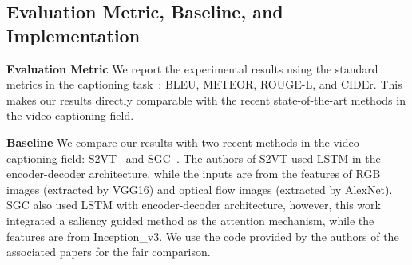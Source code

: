 \subsection{Evaluation Metric, Baseline, and Implementation}
\textbf{Evaluation Metric} We report the experimental results using the standard metrics in the captioning task~\cite{Xu16_MSR_Dataset}: BLEU, METEOR, ROUGE-L, and CIDEr. This makes our results directly comparable with the recent state-of-the-art methods in the video captioning field.

\textbf{Baseline} We compare our results with two recent methods in the video captioning field: S2VT~\cite{Venugopalan2016} and SGC~\cite{Ramanishka2017cvpr}. The authors of S2VT used LSTM in the encoder-decoder architecture, while the inputs are from the features of RGB images (extracted by VGG16) and optical flow images (extracted by AlexNet). SGC also used LSTM with encoder-decoder architecture, however, this work integrated a saliency guided method as the attention mechanism, while the features are from Inception\_v3. We use the code provided by the authors of the associated papers for the fair comparison.


